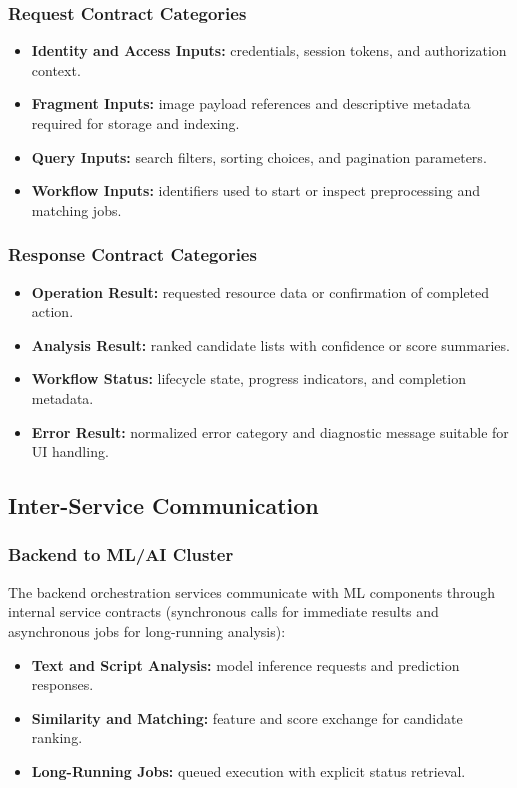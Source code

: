 \documentclass[12pt, titlepage]{article}
\begin{document}
\subsubsection{Request Contract Categories}
\begin{itemize}
  \item \textbf{Identity and Access Inputs:} credentials, session tokens, and authorization context.
  \item \textbf{Fragment Inputs:} image payload references and descriptive metadata required for storage and indexing.
  \item \textbf{Query Inputs:} search filters, sorting choices, and pagination parameters.
  \item \textbf{Workflow Inputs:} identifiers used to start or inspect preprocessing and matching jobs.
\end{itemize}

\subsubsection{Response Contract Categories}
\begin{itemize}
  \item \textbf{Operation Result:} requested resource data or confirmation of completed action.
  \item \textbf{Analysis Result:} ranked candidate lists with confidence or score summaries.
  \item \textbf{Workflow Status:} lifecycle state, progress indicators, and completion metadata.
  \item \textbf{Error Result:} normalized error category and diagnostic message suitable for UI handling.
\end{itemize}

\subsection{Inter-Service Communication}

\subsubsection{Backend to ML/AI Cluster}
The backend orchestration services communicate with ML components through internal service contracts (synchronous calls for immediate results and asynchronous jobs for long-running analysis):
\begin{itemize}
  \item \textbf{Text and Script Analysis:} model inference requests and prediction responses.
  \item \textbf{Similarity and Matching:} feature and score exchange for candidate ranking.
  \item \textbf{Long-Running Jobs:} queued execution with explicit status retrieval.
\end{itemize}
\end{document}

